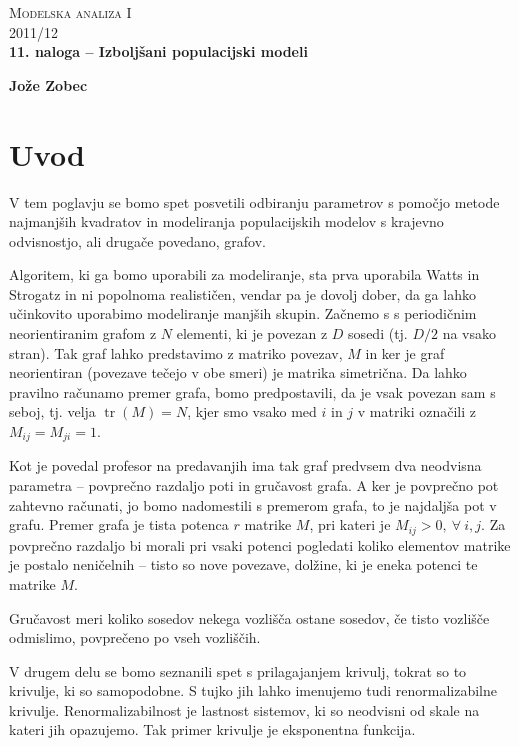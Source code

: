 \documentclass[a4 paper, 12pt]{article}
\newcommand{\tr}{
	\operatorname{tr}
}
\begin{document}
\begin{center}
\textsc{Modelska analiza I}\\
\textsc{2011/12}\\[0.5cm]
\textbf{11. naloga -- Izbolj\v sani populacijski modeli}
\end{center}
\begin{flushright}
\textbf{Jože Zobec}\\
\end{flushright}

\section{Uvod}

V tem poglavju se bomo spet posvetili odbiranju parametrov s pomo\v cjo metode najmanj\v sih kvadratov in
modeliranja populacijskih modelov s krajevno odvisnostjo, ali druga\v ce povedano, grafov.

Algoritem, ki ga bomo uporabili za modeliranje, sta prva uporabila Watts in Strogatz in ni popolnoma realisti\v cen,
vendar pa je dovolj dober, da ga lahko u\v cinkovito uporabimo modeliranje manj\v sih skupin. Za\v cnemo s
s periodi\v cnim neorientiranim grafom z $N$ elementi, ki je povezan z $D$ sosedi (tj. $D/2$ na vsako stran). Tak
graf lahko predstavimo z matriko povezav, $M$ in ker je graf neorientiran (povezave te\v cejo v obe smeri) je matrika
simetri\v cna. Da lahko pravilno ra\v cunamo premer grafa, bomo predpostavili, da je vsak povezan sam s seboj,
tj. velja $\tr(M) = N$, kjer smo vsako med $i$ in $j$ v matriki ozna\v cili z $M_{ij} = M_{ji} = 1$.

Kot je povedal profesor na predavanjih ima tak graf predvsem dva neodvisna parametra -- povpre\v cno razdaljo poti in
gru\v cavost grafa. A ker je povpre\v cno pot zahtevno ra\v cunati, jo bomo nadomestili s premerom grafa, to je
najdalj\v sa pot v grafu. Premer grafa je tista potenca $r$ matrike $M$, pri kateri je $M_{ij} > 0,\ \forall\ i,j$.
Za povpre\v cno razdaljo bi morali pri vsaki potenci pogledati koliko elementov matrike je postalo neni\v celnih -- tisto
so nove povezave, dol\v zine, ki je eneka potenci te matrike $M$.

Gru\v cavost meri koliko sosedov nekega vozli\v s\v ca ostane sosedov, \v ce tisto vozli\v s\v ce odmislimo, povpre\v ceno
po vseh vozli\v s\v cih.

V drugem delu se bomo seznanili spet s prilagajanjem krivulj, tokrat so to krivulje, ki so samopodobne. S tujko
jih lahko imenujemo tudi renormalizabilne krivulje. Renormalizabilnost je lastnost sistemov, ki so neodvisni od
skale na kateri jih opazujemo. Tak primer krivulje je eksponentna funkcija.
\end{document}
